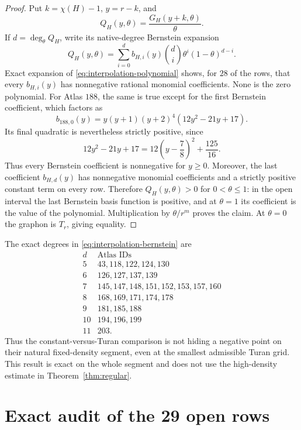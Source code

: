 \documentclass[11pt]{article}
\begin{document}
\begin{proof}
Put $k=\chi(H)-1$, $y=r-k$, and
\[
 Q_H(y,\theta)=\frac{G_H(y+k,\theta)}{\theta}.
\]
If $d=\deg_\theta Q_H$, write its native-degree Bernstein expansion
\begin{equation}
 Q_H(y,\theta)=
 \sum_{i=0}^d b_{H,i}(y)\binom di
 \theta^i(1-\theta)^{d-i}.
 \label{eq:interpolation-bernstein}
\end{equation}
Exact expansion of \eqref{eq:interpolation-polynomial} shows, for $28$ of
the rows, that every $b_{H,i}(y)$ has nonnegative rational monomial
coefficients.  None is the zero polynomial.  For Atlas $188$, the same is
true except for the first Bernstein coefficient, which factors as
\[
 b_{188,0}(y)=
 y(y+1)(y+2)^4(12y^2-21y+17).
\]
Its final quadratic is nevertheless strictly positive, since
\[
 12y^2-21y+17
 =12\left(y-\frac78\right)^2+\frac{125}{16}.
\]
Thus every Bernstein coefficient is nonnegative for $y\geq0$.  Moreover,
the last coefficient $b_{H,d}(y)$ has nonnegative monomial coefficients and
a strictly positive constant term on every row.  Therefore
$Q_H(y,\theta)>0$ for $0<\theta\leq1$: in the open interval the last
Bernstein basis function is positive, and at $\theta=1$ its coefficient is
the value of the polynomial.  Multiplication by $\theta/r^m$ proves the
claim.  At $\theta=0$ the graphon is $T_r$, giving equality.
\end{proof}

The exact degrees in \eqref{eq:interpolation-bernstein} are
\[
\begin{array}{c|l}
d&\text{Atlas IDs}\\ \hline
5&43,118,122,124,130\\
6&126,127,137,139\\
7&145,147,148,151,152,153,157,160\\
8&168,169,171,174,178\\
9&181,185,188\\
10&194,196,199\\
11&203.
\end{array}
\]
Thus the constant-versus-Turan comparison is not hiding a negative point on
their natural fixed-density segment, even at the smallest admissible Turan
grid.  This result is exact on the whole segment and does not use the
high-density estimate in Theorem~\ref{thm:regular}.

\section{Exact audit of the 29 open rows}
\end{document}

